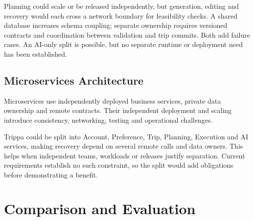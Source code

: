 Planning could scale or be released independently, but generation, editing and recovery would each cross a network boundary for feasibility checks. A shared database increases schema coupling; separate ownership requires versioned contracts and coordination between validation and trip commits. Both add failure cases. An AI-only split is possible, but no separate runtime or deployment need has been established.

\subsection{Microservices Architecture}
Microservices use independently deployed business services, private data ownership and remote contracts. Their independent deployment and scaling introduce consistency, networking, testing and operational challenges.

Trippa could be split into Account, Preference, Trip, Planning, Execution and AI services, making recovery depend on several remote calls and data owners. This helps when independent teams, workloads or releases justify separation. Current requirements establish no such constraint, so the split would add obligations before demonstrating a benefit.

\section{Comparison and Evaluation}
